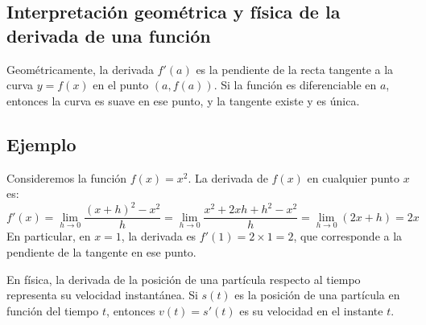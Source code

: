 \subsection{Interpretación geométrica y física de la derivada de una función}

Geométricamente, la derivada $f'(a)$ es la pendiente de la recta tangente a la curva $y = f(x)$ en el punto $(a, f(a))$. Si la función es diferenciable en $a$, entonces la curva es suave en ese punto, y la tangente existe y es única.

\begin{center}
\end{center}

\subsection*{Ejemplo}
Consideremos la función $f(x) = x^2$. La derivada de $f(x)$ en cualquier punto $x$ es:
\begin{equation*}
    f'(x) = \lim_{h \to 0} \frac{(x+h)^2 - x^2}{h} = \lim_{h \to 0} \frac{x^2 + 2xh + h^2 - x^2}{h} = \lim_{h \to 0} (2x + h) = 2x
\end{equation*}
En particular, en $x = 1$, la derivada es $f'(1) = 2 \times 1 = 2$, que corresponde a la pendiente de la tangente en ese punto.

En física, la derivada de la posición de una partícula respecto al tiempo representa su velocidad instantánea. Si $s(t)$ es la posición de una partícula en función del tiempo $t$, entonces $v(t) = s'(t)$ es su velocidad en el instante $t$.


